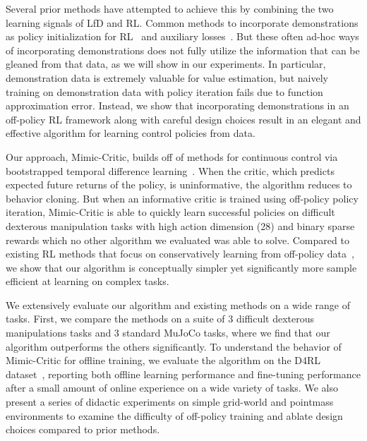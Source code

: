 Several prior methods have attempted to achieve this by combining the two learning signals of LfD and RL. 
Common methods to incorporate demonstrations as policy initialization for RL~\citep{peters2010reps, rajeswaran2018dextrous} and auxiliary losses~\citep{hester17dqfd, vecerik17ddpgfd, nair2018demonstrations}.
But these often ad-hoc ways of incorporating demonstrations does not fully utilize the information that can be gleaned from that data, as we will show in our experiments. 
In particular, demonstration data is extremely valuable for value estimation, but naively training on demonstration data with policy iteration fails due to function approximation error. 
Instead, we show that incorporating demonstrations in an off-policy RL framework along with careful design choices result in an elegant and effective algorithm for learning control policies from data.

Our approach, Mimic-Critic, builds off of methods for continuous control via bootstrapped temporal difference learning~\citep{fujimoto2018td3, haarnoja2018sac}. 
When the critic, which predicts expected future returns of the policy, is uninformative, the algorithm reduces to behavior cloning. 
But when an informative critic is trained using off-policy policy iteration, Mimic-Critic is able to quickly learn successful policies on difficult dexterous manipulation tasks with high action dimension (28) and binary sparse rewards which no other algorithm we evaluated was able to solve. 
Compared to existing RL methods that focus on conservatively learning from off-policy data~\citep{peng2019awr, kumar19bear, fujimoto19bcq}, we show that our algorithm is conceptually simpler yet significantly more sample efficient at learning on complex tasks.

We extensively evaluate our algorithm and existing methods on a wide range of tasks. 
First, we compare the methods on a suite of 3 difficult dexterous manipulations tasks and 3 standard MuJoCo tasks, where we find that our algorithm outperforms the others significantly. 
To understand the behavior of Mimic-Critic for offline training, we evaluate the algorithm on the D4RL dataset~\citep{fu2020d4rl}, reporting both offline learning performance and fine-tuning performance after a small amount of online experience on a wide variety of tasks.
We also present a series of didactic experiments on simple grid-world and pointmass environments to examine the difficulty of off-policy training and ablate design choices compared to prior methods.
